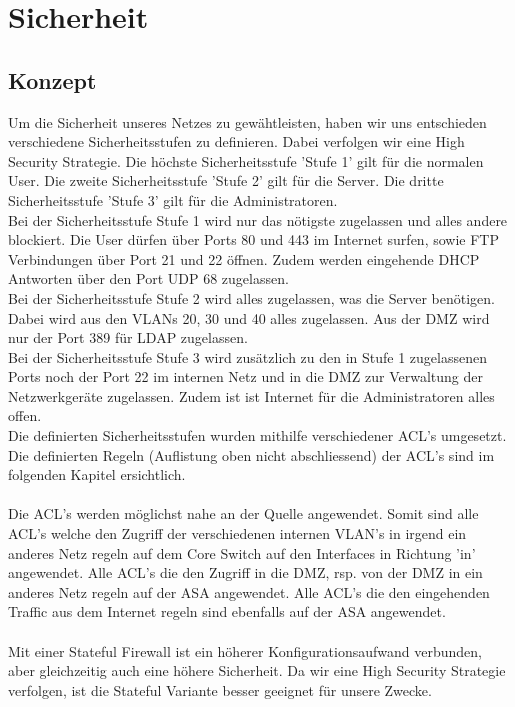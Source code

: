 \documentclass[11pt,a4paper,parskip=half]{scrartcl}
\begin{document}
\section{Sicherheit}
\subsection{Konzept}
Um die Sicherheit unseres Netzes zu gewähtleisten, haben wir uns entschieden verschiedene Sicherheitsstufen zu definieren. Dabei verfolgen wir eine High Security Strategie. Die höchste Sicherheitsstufe 'Stufe 1' gilt für die normalen User. Die zweite Sicherheitsstufe 'Stufe 2' gilt für die Server. Die dritte Sicherheitsstufe 'Stufe 3' gilt für die Administratoren.\\
Bei der Sicherheitsstufe Stufe 1 wird nur das nötigste zugelassen und alles andere blockiert. Die User dürfen über Ports 80 und 443 im Internet surfen, sowie FTP Verbindungen über Port 21 und 22 öffnen. Zudem werden eingehende DHCP Antworten über den Port UDP 68 zugelassen.\\
Bei der Sicherheitsstufe Stufe 2 wird alles zugelassen, was die Server benötigen. Dabei wird aus den VLANs 20, 30 und 40 alles zugelassen. Aus der DMZ wird nur der Port 389 für LDAP zugelassen.\\
Bei der Sicherheitsstufe Stufe 3 wird zusätzlich zu den in Stufe 1 zugelassenen Ports noch der Port 22 im internen Netz und in die DMZ zur Verwaltung der Netzwerkgeräte zugelassen. Zudem ist ist Internet für die Administratoren alles offen.\\
Die definierten Sicherheitsstufen wurden mithilfe verschiedener ACL's umgesetzt. Die definierten Regeln (Auflistung oben nicht abschliessend) der ACL's sind im folgenden Kapitel ersichtlich.\\
\\
Die ACL's werden möglichst nahe an der Quelle angewendet. Somit sind alle ACL's welche den Zugriff der verschiedenen internen VLAN's in irgend ein anderes Netz regeln auf dem Core Switch auf den Interfaces in Richtung 'in' angewendet. Alle ACL's die den Zugriff in die DMZ, rsp. von der DMZ in ein anderes Netz regeln auf der ASA angewendet. Alle ACL's die den eingehenden Traffic aus dem Internet regeln sind ebenfalls auf der ASA angewendet.\\
\\
Mit einer Stateful Firewall ist ein höherer Konfigurationsaufwand verbunden, aber gleichzeitig auch eine höhere Sicherheit. Da wir eine High Security Strategie verfolgen, ist die Stateful Variante besser geeignet für unsere Zwecke.\\
\end{document}
